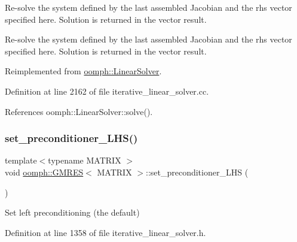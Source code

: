 Re-\/solve the system defined by the last assembled Jacobian and the rhs vector specified here. Solution is returned in the vector result. 

Re-\/solve the system defined by the last assembled Jacobian and the rhs vector specified here. Solution is returned in the vector result. 

Reimplemented from \hyperlink{classoomph_1_1LinearSolver_a3b310d08333033edc119b2a5bd7dcbfb}{oomph\+::\+Linear\+Solver}.



Definition at line 2162 of file iterative\+\_\+linear\+\_\+solver.\+cc.



References oomph\+::\+Linear\+Solver\+::solve().

\mbox{\label{classoomph_1_1GMRES_ab46117fdc9252901bf02bd6a0f470ad6}} 
\subsubsection{\texorpdfstring{set\+\_\+preconditioner\+\_\+\+L\+H\+S()}{set\_preconditioner\_LHS()}}
{\footnotesize\ttfamily template$<$typename M\+A\+T\+R\+IX $>$ \\
void \hyperlink{classoomph_1_1GMRES}{oomph\+::\+G\+M\+R\+ES}$<$ M\+A\+T\+R\+IX $>$\+::set\+\_\+preconditioner\+\_\+\+L\+HS (\begin{DoxyParamCaption}{ }\end{DoxyParamCaption})\hspace{0.3cm}{\ttfamily [inline]}}



Set left preconditioning (the default) 



Definition at line 1358 of file iterative\+\_\+linear\+\_\+solver.\+h.

\mbox{\label{classoomph_1_1GMRES_a42ac539e54fda76307ab5c4920ad01e6}} 
